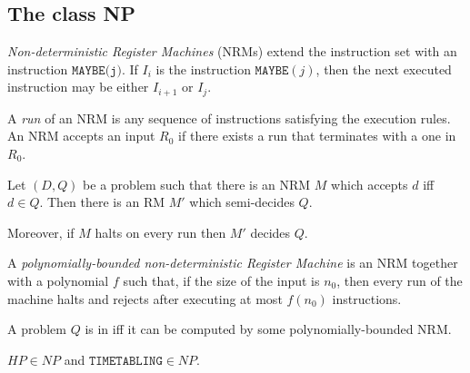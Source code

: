 \documentclass{article}
\begin{document}
\subsection{The class NP}

\begin{definition}
    \emph{Non-deterministic Register Machines} (NRMs) extend the instruction set with an instruction 
    $\texttt{MAYBE(j)}$. If $I_i$ is the instruction $\texttt{MAYBE}(j)$, then the next executed instruction 
    may be either $I_{i+1}$ or $I_j$.

    A \emph{run} of an NRM is any sequence of instructions satisfying the execution rules. An NRM accepts 
    an input $R_0$ if there exists a run that terminates with a one in $R_0$.
\end{definition}

\begin{theorem}[Notes II.10]
    Let $(D,Q)$ be a problem such that there is an NRM $M$ which accepts $d$ iff $d\in Q$.
    Then there is an RM $M'$ which semi-decides $Q$.
    
    Moreover, if $M$ halts on every run then $M'$ decides $Q$.
\end{theorem}

\begin{definition}
    A \emph{polynomially-bounded non-deterministic Register Machine} is an NRM together with a polynomial
    $f$ such that, if the size of the input is $n_0$, then every run of the machine halts and 
    rejects after executing at most $f(n_0)$ instructions.

    A problem $Q$ is in \nptime iff it can be computed by some polynomially-bounded NRM.
\end{definition}

\begin{theorem}[Notes II.12]
    $HP\in NP$ and $\texttt{TIMETABLING}\in NP$.
\end{theorem}
\end{document}
